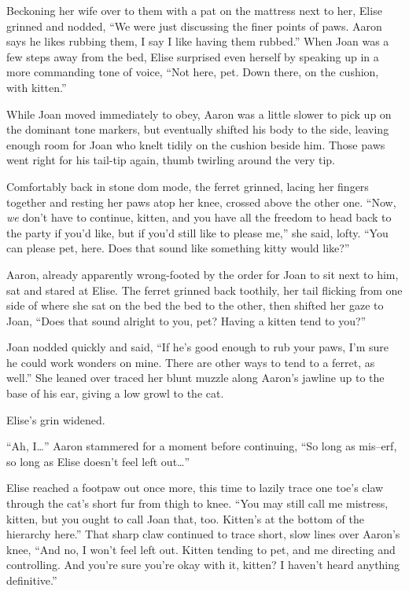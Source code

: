 Beckoning her wife over to them with a pat on the mattress next to her,
Elise grinned and nodded, ``We were just discussing the finer points of
paws. Aaron says he likes rubbing them, I say I like having them
rubbed.'' When Joan was a few steps away from the bed, Elise surprised
even herself by speaking up in a more commanding tone of voice, ``Not
here, pet. Down there, on the cushion, with kitten.''

While Joan moved immediately to obey, Aaron was a little slower to pick
up on the dominant tone markers, but eventually shifted his body to the
side, leaving enough room for Joan who knelt tidily on the cushion
beside him. Those paws went right for his tail-tip again, thumb twirling
around the very tip.

Comfortably back in stone dom mode, the ferret grinned, lacing her
fingers together and resting her paws atop her knee, crossed above the
other one. ``Now, \emph{we} don't have to continue, kitten, and you have
all the freedom to head back to the party if you'd like, but if you'd
still like to please me,'' she said, lofty. ``You can please pet, here.
Does that sound like something kitty would like?''

Aaron, already apparently wrong-footed by the order for Joan to sit next
to him, sat and stared at Elise. The ferret grinned back toothily, her
tail flicking from one side of where she sat on the bed the bed to the
other, then shifted her gaze to Joan, ``Does that sound alright to you,
pet? Having a kitten tend to you?''

Joan nodded quickly and said, ``If he's good enough to rub your paws,
I'm sure he could work wonders on mine. There are other ways to tend to
a ferret, as well.'' She leaned over traced her blunt muzzle along
Aaron's jawline up to the base of his ear, giving a low growl to the
cat.

Elise's grin widened.

``Ah, I\ldots{}'' Aaron stammered for a moment before continuing, ``So
long as mis--erf, so long as Elise doesn't feel left out\ldots{}''

Elise reached a footpaw out once more, this time to lazily trace one
toe's claw through the cat's short fur from thigh to knee. ``You may
still call me mistress, kitten, but you ought to call Joan that, too.
Kitten's at the bottom of the hierarchy here.'' That sharp claw
continued to trace short, slow lines over Aaron's knee, ``And no, I
won't feel left out. Kitten tending to pet, and me directing and
controlling. And you're sure you're okay with it, kitten? I haven't
heard anything definitive.''

